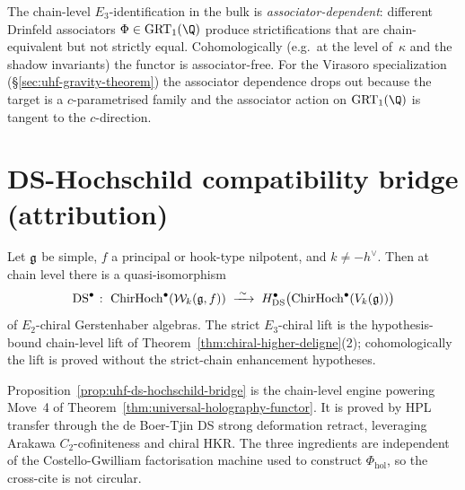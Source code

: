 \begin{remark}
\label{rem:uhf-associator}
The chain-level
$E_3$-identification in the bulk is \emph{associator-dependent}:
different Drinfeld associators $\Phi \in \mathrm{GRT}_1(\Q)$
produce strictifications that are chain-equivalent but not
strictly equal. Cohomologically (e.g.\ at the level of~$\kappa$
and the shadow invariants) the functor is associator-free. For
the Virasoro specialization (\S\ref{sec:uhf-gravity-theorem}) the
associator dependence drops out because the target is a
$c$-parametrised family and the associator action on
$\mathrm{GRT}_1(\Q)$ is tangent to the $c$-direction.
\end{remark}

\section{DS-Hochschild compatibility bridge (attribution)}
\label{sec:uhf-ds-bridge}

\begin{proposition}
\label{prop:uhf-ds-hochschild-bridge}
Let $\mathfrak{g}$ be simple, $f$ a principal or hook-type nilpotent, and
$k \neq -h^\vee$. Then at chain level there is a quasi-isomorphism
\[
 \mathrm{DS}^\bullet \;\colon\;
 \mathrm{ChirHoch}^\bullet(\mathcal{W}_k(\mathfrak{g}, f))
 \;\xrightarrow{\;\sim\;}\;
 H^\bullet_{\mathrm{DS}}\bigl(\mathrm{ChirHoch}^\bullet(V_k(\mathfrak{g}))\bigr)
\]
of $E_2$-chiral Gerstenhaber algebras. The strict $E_3$-chiral lift
is the hypothesis-bound chain-level lift of
Theorem~\ref*{thm:chiral-higher-deligne}(2); cohomologically the lift
is proved without the strict-chain enhancement hypotheses.
\end{proposition}

\begin{remark}
\label{rem:uhf-ds-role}
Proposition~\ref{prop:uhf-ds-hochschild-bridge} is the chain-level
engine powering Move~4 of
Theorem~\ref{thm:universal-holography-functor}. It is proved by
HPL transfer through the de Boer-Tjin DS strong deformation
retract, leveraging Arakawa $C_2$-cofiniteness and chiral HKR.
The three ingredients are independent of the Costello-Gwilliam
factorisation machine used to construct $\Phi_{\mathrm{hol}}$, so the
cross-cite is not circular.
\end{remark}

